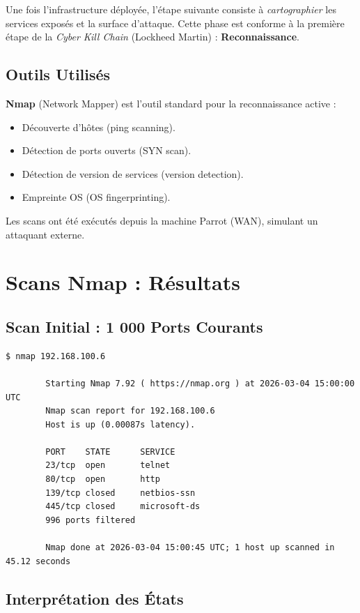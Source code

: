 \documentclass[12pt,a4paper,openany]{report}
\begin{document}
Une fois l'infrastructure déployée, l'étape suivante consiste à \textit{cartographier} les services exposés et la surface d'attaque. Cette phase est conforme à la première étape de la \textit{Cyber Kill Chain} (Lockheed Martin) : \textbf{Reconnaissance}.

\subsection{Outils Utilisés}

\textbf{Nmap} (Network Mapper) est l'outil standard pour la reconnaissance active :
\begin{itemize}
	\item Découverte d'hôtes (ping scanning).
	\item Détection de ports ouverts (SYN scan).
	\item Détection de version de services (version detection).
	\item Empreinte OS (OS fingerprinting).
\end{itemize}

Les scans ont été exécutés depuis la machine Parrot (WAN), simulant un attaquant externe.

\section{Scans Nmap : Résultats}

\subsection{Scan Initial : 1 000 Ports Courants}

\begin{lstlisting}[caption=Nmap : scan des 1000 ports courants]
		$ nmap 192.168.100.6
		
		Starting Nmap 7.92 ( https://nmap.org ) at 2026-03-04 15:00:00 UTC
		Nmap scan report for 192.168.100.6
		Host is up (0.00087s latency).
		
		PORT    STATE      SERVICE
		23/tcp  open       telnet
		80/tcp  open       http
		139/tcp closed     netbios-ssn
		445/tcp closed     microsoft-ds
		996 ports filtered
		
		Nmap done at 2026-03-04 15:00:45 UTC; 1 host up scanned in 45.12 seconds
	\end{lstlisting}

\subsection{Interprétation des États}
\end{document}
